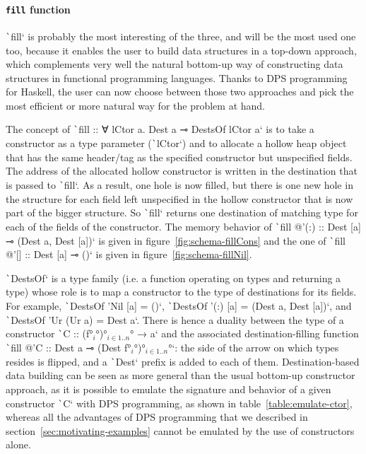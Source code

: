 \documentclass[english]{jflart}
\begin{document}
\paragraph{\texttt{fill} function}

\texttt`fill` is probably the most interesting of the three, and will be the most used one too, because it enables the user to build data structures in a top-down approach, which complements very well the natural bottom-up way of constructing data structures in functional programming languages. Thanks to DPS programming for Haskell, the user can now choose between those two approaches and pick the most efficient or more natural way for the problem at hand.

The concept of \texttt`fill :: ∀ lCtor a. Dest a ⊸ DestsOf lCtor a` is to take a constructor as a type parameter (\texttt`lCtor`) and to allocate a hollow heap object that has the same header/tag as the specified constructor but unspecified fields. The address of the allocated hollow constructor is written in the destination that is passed to \texttt`fill`. As a result, one hole is now filled, but there is one new hole in the structure for each field left unspecified in the hollow constructor that is now part of the bigger structure. So \texttt`fill` returns one destination of matching type for each of the fields of the constructor. The memory behavior of \texttt`fill @'(:) :: Dest [a] ⊸ (Dest a, Dest [a])` is given in figure~\ref{fig:schema-fillCons} and the one of \texttt`fill @'[] :: Dest [a] ⊸ ()` is given in figure~\ref{fig:schema-fillNil}.

\texttt`DestsOf` is a type family (i.e. a function operating on types and returning a type) whose role is to map a constructor to the type of destinations for its fields. For example, \texttt`DestsOf 'Nil [a] = ()`, \texttt`DestsOf '(:) [a] = (Dest a, Dest [a])`, and \texttt`DestsOf 'Ur (Ur a) = Dest a`. There is hence a duality between the type of a constructor \texttt`C :: (f°$_i$°)°$_{i \in 1..n}$° → a` and the associated destination-filling function \texttt`fill @'C :: Dest a ⊸ (Dest f°$_i$°)°$_{i \in 1..n}$°`: the side of the arrow on which types resides is flipped, and a \texttt`Dest` prefix is added to each of them. Destination-based data building can be seen as more general than the usual bottom-up constructor approach, as it is possible to emulate the signature and behavior of a given constructor \texttt`C` with DPS programming, as shown in table~\ref{table:emulate-ctor}, whereas all the advantages of DPS programming that we described in section~\ref{sec:motivating-examples} cannot be emulated by the use of constructors alone.
\end{document}
